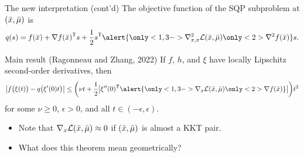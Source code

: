 \documentclass[
]{talk}
\newcommand*{\ceq}{h}
\newcommand*{\iter}[1][]{x\ifblank{#1}{}{_{#1}}}
\newcommand*{\lag}{\mathcal{L}}
\newcommand*{\lmeq}[1][]{\mu\ifblank{#1}{}{_{#1}}}
\newcommand*{\obj}{f}
\newcommand*{\step}[1][]{s\ifblank{#1}{}{_{#1}}}
\begin{document}
\begin{frame}{The new interpretation (cont'd)}
    The objective function of the SQP subproblem at $(\bar{\iter}, \bar{\lmeq})$ is
    \begin{equation*}
        q(\step) = \obj(\bar{\iter}) + \nabla \obj(\bar{\iter})^{\T} \step + \frac{1}{2} \step^{\T} \alert{\only<1,3->{\nabla_{\iter, \iter}^2 \lag(\bar{\iter}, \bar{\lmeq})}\only<2>{\nabla^2 \obj(\bar{\iter})}} \step\text{.}
    \end{equation*}

    \begin{alertblock}{Main result (Ragonneau and Zhang, 2022)}
        If $\obj$, $\ceq$, and $\xi$ have locally Lipschitz second-order derivatives, then
        \begin{equation*}
            \abs[\big]{\obj\big(\xi(t)\big) - q\big(\xi'(0)t\big)} \le \bigg(\nu t + \frac{1}{2} \abs[\big]{\xi''(0)^{\T} \alert{\only<1,3->{\nabla_{\iter} \lag(\bar{\iter}, \bar{\lmeq})}\only<2>{\nabla \obj(\bar{\iter})}}}\bigg) t^2
        \end{equation*}
        for some $\nu \ge 0$, $\epsilon > 0$, and all $t \in (-\epsilon, \epsilon)$.
    \end{alertblock}

    \smallskip

    \begin{itemize}
        \item<3-> Note that $\nabla_{\iter} \lag(\bar{\iter}, \bar{\lmeq}) \approx 0$ if $(\bar{\iter}, \bar{\lmeq})$ is \alert{almost} a KKT pair.
        \item<4> What does this theorem mean geometrically?
    \end{itemize}

\end{frame}
\end{document}

